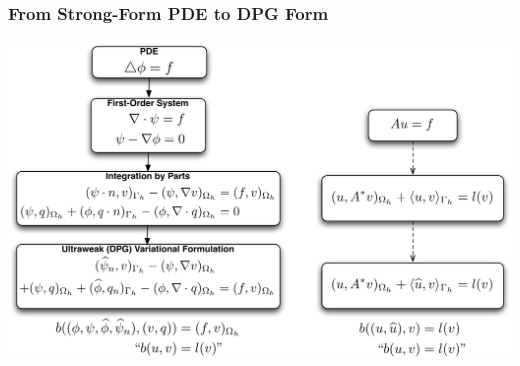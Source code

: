 \documentclass[mathserif]{beamer}
\begin{document}
\begin{frame}                                                                                                                                                                          
\frametitle{From Strong-Form PDE to DPG Form}
\begin{center}
\includegraphics[width=\linewidth]{../figures/DPGFormCartoon}\\
\end{center}
\end{frame}              
\end{document}
